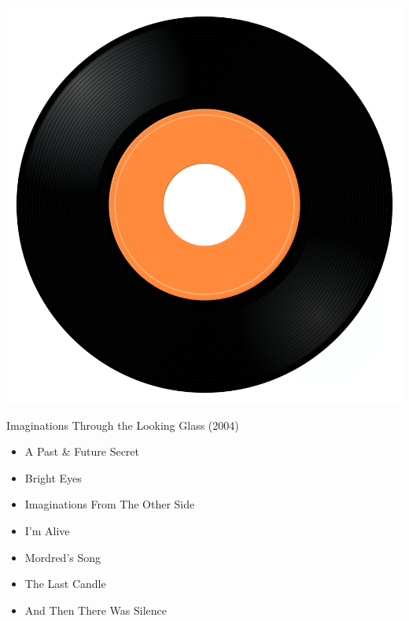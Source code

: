 \begin{minipage}[t]{0.25\textwidth}
\captionsetup{type=figure}
\includegraphics[width=\textwidth]{Images/cover.png}
\caption*{Imaginations Through the Looking Glass (2004)}
\end{minipage}
\begin{minipage}[t]{0.25\textwidth}\vspace{0pt}
\begin{itemize}[nosep,leftmargin=1em,labelwidth=*,align=left]
	\setlength{\itemsep}{0pt}
	\item A Past \& Future Secret
	\item Bright Eyes
	\item Imaginations From The Other Side
	\item I'm Alive
	\item Mordred's Song
	\item The Last Candle
	\item And Then There Was Silence
\end{itemize}
\end{minipage}
